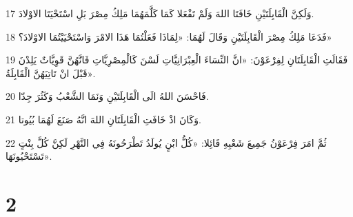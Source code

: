 \par 17 وَلَكِنَّ الْقَابِلَتَيْنِ خَافَتَا اللهَ وَلَمْ تَفْعَلا كَمَا كَلَّمَهُمَا مَلِكُ مِصْرَ بَلِ اسْتَحْيَتَا الاوْلادَ.
\par 18 فَدَعَا مَلِكُ مِصْرَ الْقَابِلَتَيْنِ وَقَالَ لَهُمَا: «لِمَاذَا فَعَلْتُمَا هَذَا الامْرَ وَاسْتَحْيَيْتُمَا الاوْلادَ؟»
\par 19 فَقَالَتِ الْقَابِلَتَانِ لِفِرْعَوْنَ: «انَّ النِّسَاءَ الْعِبْرَانِيَّاتِ لَسْنَ كَالْمِصْرِيَّاتِ فَانَّهُنَّ قَوِيَّاتٌ يَلِدْنَ قَبْلَ انْ تَاتِيَهُنَّ الْقَابِلَةُ».
\par 20 فَاحْسَنَ اللهُ الَى الْقَابِلَتَيْنِ وَنَمَا الشَّعْبُ وَكَثُرَ جِدّا.
\par 21 وَكَانَ اذْ خَافَتِ الْقَابِلَتَانِ اللهَ انَّهُ صَنَعَ لَهُمَا بُيُوتا.
\par 22 ثُمَّ امَرَ فِرْعَوْنُ جَمِيعَ شَعْبِهِ قَائِلا: «كُلُّ ابْنٍ يُولَدُ تَطْرَحُونَهُ فِي النَّهْرِ لَكِنَّ كُلَّ بِنْتٍ تَسْتَحْيُونَهَا».

\chapter{2}

